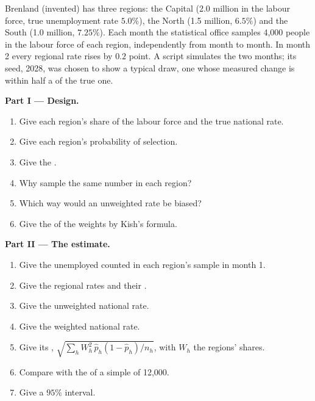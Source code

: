 \begin{problem}\label{pb:b1:sampling-and-inference:survey}
Brenland (invented) has three regions: the Capital (2.0 million in the
labour force, true unemployment rate $5.0\%$), the North (1.5 million, $6.5\%$) and
the South (1.0 million, $7.25\%$). Each month the statistical office samples
4,000 people in the labour force of each region, independently from month to
month. In month 2 every regional rate rises by $0.2$ point. A script simulates
the two months; its seed, 2028, was chosen to show a typical draw, one whose
measured change is within half a  of the true one.

\medskip\noindent\textbf{Part I --- Design.}
\begin{enumerate}
  \item Give each region's share of the labour force and the true national rate.
  \item Give each region's probability of selection.
  \item Give the .
  \item Why sample the same number in each region?
  \item Which way would an unweighted rate be biased?
  \item Give the  of the weights by Kish's formula.
\end{enumerate}

\medskip\noindent\textbf{Part II --- The estimate.}
\begin{enumerate}[resume]
  \item Give the unemployed counted in each region's sample in month 1.
  \item Give the regional rates and their .
  \item Give the unweighted national rate.
  \item Give the weighted national rate.
  \item Give its , $\sqrt{\sum_h W_h^2\,\hat p_h(1 - \hat p_h)/n_h}$, with $W_h$ the regions' shares.
  \item Compare with the  of a simple  of 12,000.
  \item Give a $95\%$ interval.
\end{enumerate}


\end{problem}
